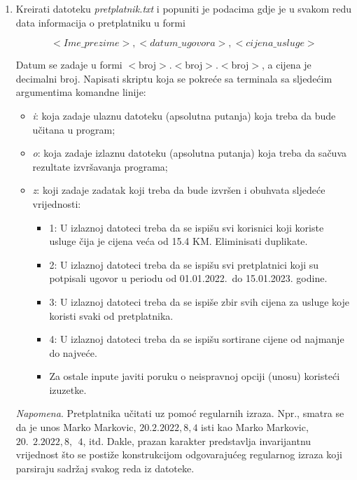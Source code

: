 \begin{enumerate}
   \item Kreirati datoteku \emph{pretplatnik.txt} i popuniti je podacima gdje je u svakom redu
   data informacija o pretplatniku u formi
   
   $$<Ime\_prezime>, <datum\_ugovora>, <cijena\_usluge>$$
   
   Datum se zadaje u formi $<$broj$>$.$<$broj$>$.$<$broj$>$, a cijena je decimalni broj. Napisati 
   skriptu koja se pokreće sa terminala sa sljedećim argumentima komandne linije:
   \begin{itemize}
   	\item \textit{i}: koja zadaje ulaznu datoteku (apsolutna putanja) koja treba da bude učitana
   u program;
   \item \textit{o}: koja zadaje izlaznu datoteku (apsolutna putanja) koja treba da sačuva
   rezultate izvršavanja programa;
    \item \textit{z}: koji zadaje zadatak koji treba da bude izvršen i obuhvata sljedeće vrijednosti:
    \begin{itemize}
    	\item  1: U izlaznoj datoteci treba da se ispišu svi korisnici koji koriste usluge čija je  cijena veća od 15.4 KM. Elimini\-sati duplikate. 
        \item 2: U izlaznoj datoteci treba da se ispišu svi pretplatnici koji su potpisali ugovor u periodu od 01.01.2022.\ do 15.01.2023. godine.
        \item  3: U izlaznoj datoteci treba da se ispiše zbir svih cijena za usluge koje koristi svaki od pretplatnika. 
        \item 4: U izlaznoj datoteci treba da se ispišu sortirane cijene od najmanje do  najveće.
        \item Za ostale inpute javiti poruku o neispravnoj opciji  (unosu) koristeći izuzetke.
         \end{itemize}
   \end{itemize}
   \textit{Napomena}. Pretplatnika učitati uz pomoć regularnih izraza. Npr., smatra se da je unos Marko
   Markovic, $20.2.2022, 8,4$ isti kao Marko Markovic, $20.\ \ 2.2022, 8,\ \ 4$, itd.  Dakle, prazan karakter predstavlja 
   invarijantnu vrijednost što se postiže konstrukcijom odgovarajućeg regularnog izraza koji parsiraju  sadržaj svakog reda iz datoteke.
\end{enumerate}